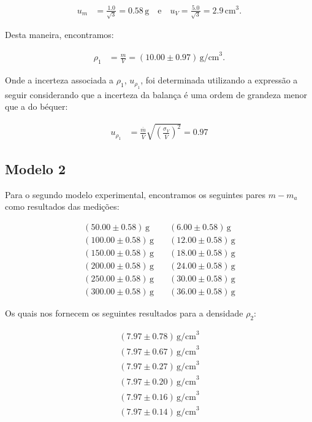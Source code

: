 \documentclass{article}
\begin{document}
\begin{multicols}{2}
\begin{align}
u_m &= \frac{1.0}{\sqrt{3}} = 0.58 \, \text{g} \quad \text{e} \quad u_V = \frac{5.0}{\sqrt{3}} = 2.9 \, \text{cm}^3.
\end{align}

Desta maneira, encontramos:

\begin{align}
\rho_1 &= \frac{m}{V} = (10.00 \pm 0.97) \, \text{g/cm}^3.
\end{align}

Onde a incerteza associada a $\rho_1$, $u_{\rho_1}$, foi determinada utilizando a expressão a seguir considerando que a incerteza da balança é uma ordem de grandeza menor que a do béquer:

\begin{align}
u_{\rho_1} &= \frac{\overline{m}}{\overline{V}} \sqrt{\left(\frac{\sigma_V}{\overline{V}}\right)^2} = 0.97
\end{align}

\subsection{Modelo 2}

Para o segundo modelo experimental, encontramos os seguintes pares $m-m_a$ como resultados das medições:

\begin{align*}
(50.00 \pm 0.58) \, \text{g} & \quad (6.00 \pm 0.58) \, \text{g} \\
(100.00 \pm 0.58) \, \text{g} & \quad (12.00 \pm 0.58) \, \text{g} \\
(150.00 \pm 0.58) \, \text{g} & \quad (18.00 \pm 0.58) \, \text{g} \\
(200.00 \pm 0.58) \, \text{g} & \quad (24.00 \pm 0.58) \, \text{g} \\
(250.00 \pm 0.58) \, \text{g} & \quad (30.00 \pm 0.58) \, \text{g} \\
(300.00 \pm 0.58) \, \text{g} & \quad (36.00 \pm 0.58) \, \text{g}
\end{align*}

Os quais nos fornecem os seguintes resultados para a densidade $\rho_2$:

\begin{align*}
(7.97 \pm 0.78) \, \text{g/cm}^3 \\
(7.97 \pm 0.67) \, \text{g/cm}^3 \\
(7.97 \pm 0.27) \, \text{g/cm}^3 \\
(7.97 \pm 0.20) \, \text{g/cm}^3 \\
(7.97 \pm 0.16) \, \text{g/cm}^3 \\
(7.97 \pm 0.14) \, \text{g/cm}^3
\end{align*}


\end{multicols}
\end{document}
